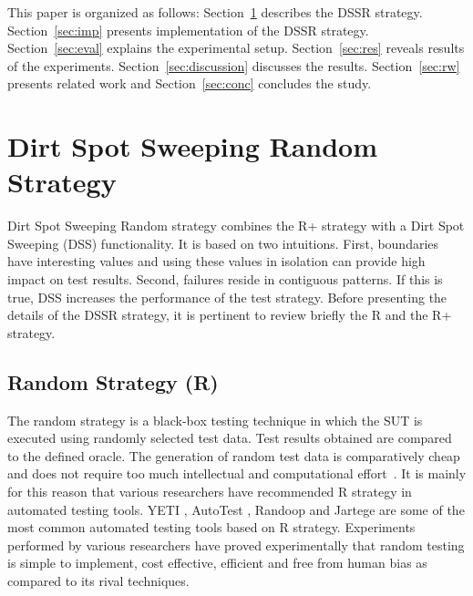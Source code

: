 \documentclass[conference]{IEEEtran}
\begin{document}
This paper is organized as follows: Section~\ref{sec:dssr} describes the DSSR strategy. Section~\ref{sec:imp} presents implementation of the DSSR strategy. Section~\ref{sec:eval} explains the experimental setup. Section~\ref{sec:res} reveals results of the experiments. Section~\ref{sec:discussion} discusses the results. Section~\ref{sec:rw} presents related work and Section~\ref{sec:conc} concludes the study.





\section{Dirt Spot Sweeping Random Strategy}\label{sec:dssr}
Dirt Spot Sweeping Random strategy combines the R+ strategy with a Dirt Spot Sweeping (DSS) functionality. It is based on two intuitions. First, boundaries have interesting values and using these values in isolation can provide high impact on test results. Second, failures reside in contiguous patterns. If this is true, DSS increases the performance of the test strategy. Before presenting the details of the DSSR strategy, it is pertinent to review briefly the R and the R+ strategy.

\subsection{Random Strategy (R)}
The random strategy is a black-box testing technique in which the SUT is executed using randomly selected test data. Test results obtained are compared to the defined oracle.%
The generation of random test data is comparatively cheap and does not require too much intellectual and computational effort~\cite{Ciupa2009}. It is mainly for this reason that various researchers have recommended R strategy in automated testing tools. YETI \cite{Oriol2010a}, AutoTest \cite{Leitner2007}, Randoop \cite{Pacheco2007} and Jartege \cite{Oriat2004} are some of the most common automated testing tools based on R strategy. Experiments performed by various researchers \cite{Ciupa2007, Duran1984, Hamlet1994} have proved experimentally that random testing is simple to implement, cost effective, efficient and free from human bias as compared to its rival techniques.
\end{document}
